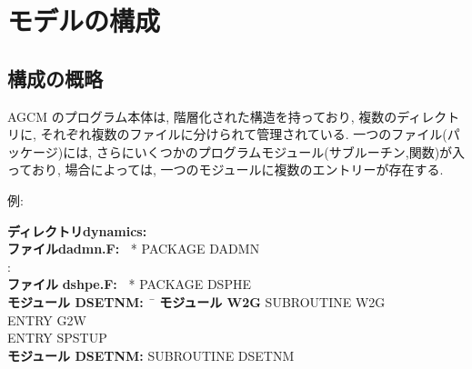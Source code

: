 ﻿%

\section{モデルの構成}

\subsection{構成の概略}

AGCM のプログラム本体は, 階層化された構造を持っており,
複数のディレクトリに, それぞれ複数のファイルに分けられて管理されている.
一つのファイル(パッケージ)には, 
さらにいくつかのプログラムモジュール(サブルーチン,関数)が入っており,
場合によっては, 一つのモジュールに複数のエントリーが存在する.

例: 
\begin{tabbing}
{\bf ディレクトリ}\= {\bf dynamics:\ } \\
 \> {\bf ファイル}\= {\bf dadmn.F:\ } 
                       * PACKAGE DADMN \\
 \>               \> : \\          
 \> {\bf ファイル} \= {\bf dshpe.F:\ } 
                       * PACKAGE DSPHE \\
 \>\> {\bf モジュール DSETNM:\ } \=  \kill
 \>\> {\bf モジュール W2G} 
                      \> SUBROUTINE W2G \\
 \>\>                 \> ENTRY      G2W \\
 \>\>                 \> ENTRY      SPSTUP \\
 \>\> {\bf モジュール DSETNM:} \>  SUBROUTINE DSETNM  \\
\end{tabbing}

